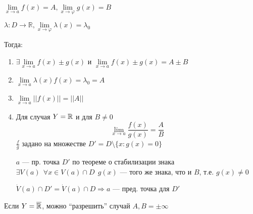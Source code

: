 $\lim\limits_{x\to a}f(x)=A, \lim\limits_{x\to \varphi}g(x)=B$

$\lambda: D\to \mathbb{R}, \lim\limits_{x\to \varphi}\lambda (x) = \lambda_0$

Тогда:
\begin{enumerate}
    \item $\exists\lim\limits_{x\to a} f(x)\pm g(x)$ и $\lim\limits_{x\to a} f(x)\pm g(x)=A\pm B$
    \item $\lim\limits_{x\to a} \lambda(x) f(x) = \lambda_0=A$
    \item $\lim\limits_{x\to a} ||f(x)||=||A||$
    \item Для случая $Y=\operatorname*{\mathbb{R}}$ и для $B\not=0$ $$\lim\limits_{x\to a}\frac{f(x)}{g(x)}=\frac{A}{B}$$
    $\frac{f}{g}$ задано на множестве $D'=D\setminus \{x:g(x)=0\}$

    $a$ --- пр. точка $D'$ по теореме о стабилизации знака $\exists V(a) \ \ \forall x\in V(a)\cap D \ \ g(x)$ --- того же знака, что и $B$, т.е. $g(x)\not = 0$

    $\dot V(a)\cap D'=\dot V(a)\cap D \Rightarrow a$ --- пред. точка для $D'$
\end{enumerate}

Если $Y=\overline{\operatorname*{\mathbb{R}}}$, можно ``разрешить'' случай $A, B=\pm \infty$

